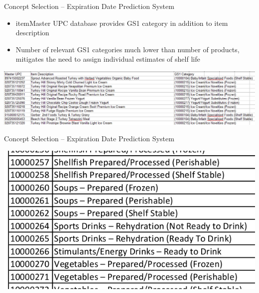 \documentclass[t]{beamer}
\begin{document}
\begin{frame}{Concept Selection -- Expiration Date Prediction System}
\begin{itemize}
\item itemMaster UPC database provides GS1 category in addition to item description
\item Number of relevant GS1 categories much lower than number of products, mitigates the need to assign individual estimates of shelf life
\end{itemize}
\begin{center}
\includegraphics[scale=0.3]{../Graphics/itemMaster}
\end{center}
\end{frame}

\begin{frame}{Concept Selection -- Expiration Date Prediction System}
\begin{center}
\includegraphics[scale=0.5]{../Graphics/gs1}
\end{center}
\end{frame}
\end{document}
